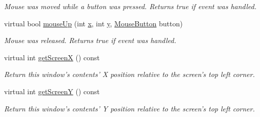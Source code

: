 \begin{DoxyCompactItemize}
\begin{DoxyCompactList}\small\item\em Mouse was moved while a button was pressed. Returns true if event was handled. \end{DoxyCompactList}\item 
\hypertarget{classGUI_1_1BorderedWindow_a2550523c9e629206502cd158f1dfc012}{virtual bool \hyperlink{classGUI_1_1BorderedWindow_a2550523c9e629206502cd158f1dfc012}{mouse\-Up} (int \hyperlink{classGUI_1_1Window_a6ca6a80ca00c9e1d8ceea8d3d99a657d}{x}, int \hyperlink{classGUI_1_1Window_a0ee8e923aff2c3661fc2e17656d37adf}{y}, \hyperlink{namespaceGUI_ad06082a7b02aa73697f39eb8e0856de9}{Mouse\-Button} button)}\label{classGUI_1_1BorderedWindow_a2550523c9e629206502cd158f1dfc012}

\begin{DoxyCompactList}\small\item\em Mouse was released. Returns true if event was handled. \end{DoxyCompactList}\item 
\hypertarget{classGUI_1_1BorderedWindow_a360d2ae9d3ebff67bab02a1855b9f0ee}{virtual int \hyperlink{classGUI_1_1BorderedWindow_a360d2ae9d3ebff67bab02a1855b9f0ee}{get\-Screen\-X} () const }\label{classGUI_1_1BorderedWindow_a360d2ae9d3ebff67bab02a1855b9f0ee}

\begin{DoxyCompactList}\small\item\em Return this window's contents' X position relative to the screen's top left corner. \end{DoxyCompactList}\item 
\hypertarget{classGUI_1_1BorderedWindow_a79e2b435d5e2e3fc3f97c4d2d783df1d}{virtual int \hyperlink{classGUI_1_1BorderedWindow_a79e2b435d5e2e3fc3f97c4d2d783df1d}{get\-Screen\-Y} () const }\label{classGUI_1_1BorderedWindow_a79e2b435d5e2e3fc3f97c4d2d783df1d}

\begin{DoxyCompactList}\small\item\em Return this window's contents' Y position relative to the screen's top left corner. \end{DoxyCompactList}\end{DoxyCompactItemize}

